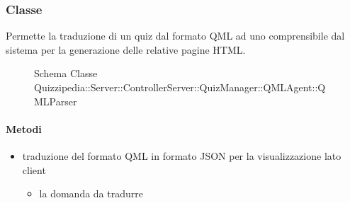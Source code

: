 \subsubsection{Classe }
Permette la traduzione di un quiz dal formato QML ad uno comprensibile dal sistema per la generazione delle relative pagine HTML.
\begin{figure}[H]
\centering
\noindent{}
\caption[Schema Classe QMLParser]{Schema Classe Quizzipedia::Server::ControllerServer::QuizManager::QMLAgent::QMLParser}
\end{figure}
\paragraph{Metodi}
\begin{itemize}
\item {}
\newline
traduzione del formato QML in formato JSON per la visualizzazione lato client
\newline
{}
\newline
\begin{itemize}
\item {}
\newline
la domanda da tradurre
\end{itemize}
\end{itemize}

